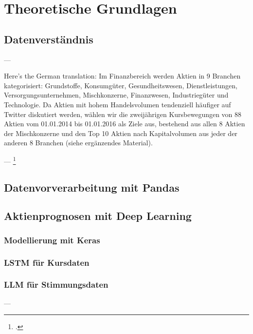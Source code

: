 \newpage
\section{Theoretische Grundlagen}\label{sec:theorie}



\subsection{Datenverständnis}\label{sec:theorie_data_understanding}

---

Here's the German translation:
Im Finanzbereich werden Aktien in 9 Branchen kategorisiert: Grundstoffe, Konsumgüter, Gesundheitswesen, Dienstleistungen, Versorgungsunternehmen, Mischkonzerne, Finanzwesen, Industriegüter und Technologie. Da Aktien mit hohem Handelsvolumen tendenziell häufiger auf Twitter diskutiert werden, wählen wir die zweijährigen Kursbewegungen von 88 Aktien vom 01.01.2014 bis 01.01.2016 als Ziele aus, bestehend aus allen 8 Aktien der Mischkonzerne und den Top 10 Aktien nach Kapitalvolumen aus jeder der anderen 8 Branchen (siehe ergänzendes Material).

---
\footcite[Kap. 3]{xu2018StockMovement}

\subsection{Datenvorverarbeitung mit Pandas}\label{sec:theorie_pandas}


\subsection{Aktienprognosen mit Deep Learning}\label{sec:theorie_dl}

\subsubsection{Modellierung mit Keras}\label{sec:theorie_keras}

\subsubsection{LSTM für Kursdaten}\label{sec:theorie_lstm}

\subsubsection{LLM für Stimmungsdaten}\label{sec:theorie_llm}
---

